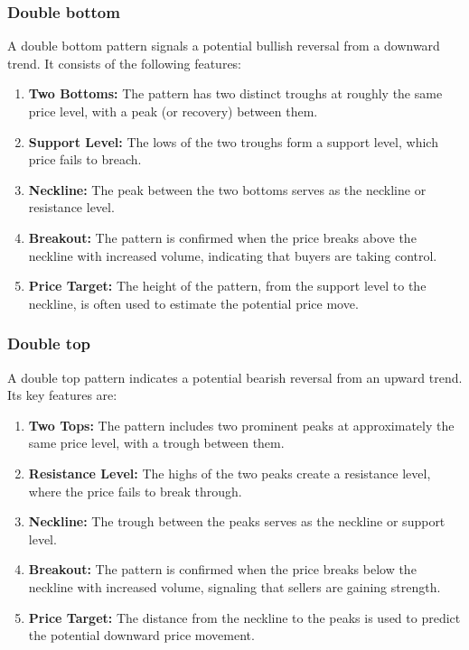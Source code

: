 \documentclass{report}
\begin{document}
     \subsubsection{Double bottom}
     \bigbreak \noindent 
     A double bottom pattern signals a potential bullish reversal from a downward trend. It consists of the following features:
     \bigbreak \noindent 
     \begin{enumerate}
         \item \textbf{Two Bottoms:} The pattern has two distinct troughs at roughly the same price level, with a peak (or recovery) between them.
         \item \textbf{Support Level:} The lows of the two troughs form a support level, which price fails to breach.
         \item \textbf{Neckline:} The peak between the two bottoms serves as the neckline or resistance level.
         \item \textbf{Breakout:} The pattern is confirmed when the price breaks above the neckline with increased volume, indicating that buyers are taking control.
         \item \textbf{Price Target:} The height of the pattern, from the support level to the neckline, is often used to estimate the potential price move.
     \end{enumerate}
     \bigbreak \noindent 
     \bigbreak \noindent 

     \bigbreak \noindent 
     \subsubsection{Double top}
     \bigbreak \noindent 
     A double top pattern indicates a potential bearish reversal from an upward trend. Its key features are:
     \bigbreak \noindent 
     \begin{enumerate}
         \item \textbf{Two Tops:} The pattern includes two prominent peaks at approximately the same price level, with a trough between them.
         \item \textbf{Resistance Level:} The highs of the two peaks create a resistance level, where the price fails to break through.
         \item \textbf{Neckline:} The trough between the peaks serves as the neckline or support level.
         \item \textbf{Breakout:} The pattern is confirmed when the price breaks below the neckline with increased volume, signaling that sellers are gaining strength.
         \item \textbf{Price Target:} The distance from the neckline to the peaks is used to predict the potential downward price movement.
     \end{enumerate}
     \bigbreak \noindent 
\end{document}
